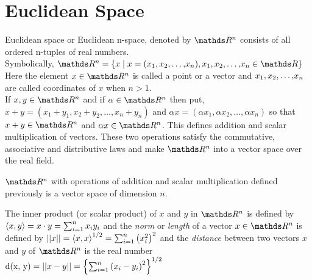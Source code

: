 \documentclass[../main-sheet.tex]{subfiles}
\begin{document}
\section{Euclidean Space}
Euclidean space or Euclidean n-space, denoted by $ \R^n $ consists of all ordered n-tuples of real numbers.\\
Symbolically, $ \R^n=\set{x\mid x=(\xn{x}{,}), \xn{x}{,}\in \R} $\\
Here the element $ x\in\R^n $ is called a point or a vector and $ {x}_1{,}\,{x}_2{,}\dots{,}{x}_n $ are called coordinates of $ x $ when $ n>1 $.\\
If $ x,y \in \R^n $ and if $ \alpha\in\R^n $ then put,\\
$ x+y=(x_1+y_1,x_2+y_2,\dots,x_n+y_n) $ and $ \alpha x=(\alpha x_1,\alpha x_2,\dots,\alpha x_n) $ so that $ x+y\in\R^n $ and $ \alpha x\in\R^n $. This defines addition and scalar multiplication of vectors. These two operations satisfy the commutative, associative and distributive laws and make $ \R^n $ into a vector space over the real field.
\begin{thm}
    $ \R^n $ with operations of addition and scalar multiplication defined previously is a vector space of dimension $ n $.
\end{thm}
\begin{defn}
    The inner product (or scalar product) of $ x $ and $ y $ in $ \R^n $ is defined by $ \left<x,y\right>=x\cdot y=\sum_{i=1}^{n} x_i y_i $ and the \emph{norm} or \emph{length} of a vector $ x \in \R^n $ is defined by $ \left\vert\left\vert x\right\vert\right\vert=\left<x,x\right>^{1/2}=\sum_{i=1}^{n}\left( x_i^2\right)^2  $ and the \emph{distance} between two vectors $ x $ and $ y $ of $ \R^n $ is the real number $ \text{d(x, y)}=\left\vert\left\vert x-y\right\vert\right\vert=\left\{\sum_{i=1}^{n} \left(x_i-y_i\right)^2\right\}^{1/2} $
\end{defn}
\end{document}

